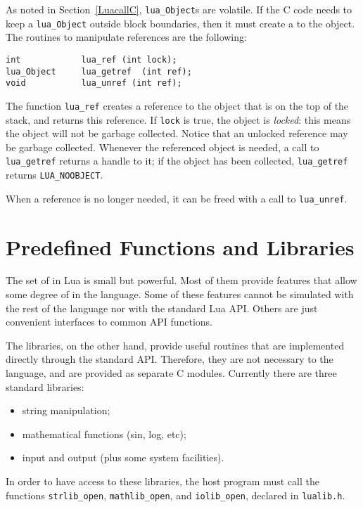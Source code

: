 As noted in Section~\ref{LuacallC}, \verb|lua_Object|s are volatile.
If the C code needs to keep a \verb|lua_Object|
outside block boundaries,
then it must create a  to the object.
The routines to manipulate references are the following:
\begin{verbatim}
int            lua_ref (int lock);
lua_Object     lua_getref  (int ref);
void           lua_unref (int ref);
\end{verbatim}
The function \verb|lua_ref| creates a reference
to the object that is on the top of the stack,
and returns this reference.
If \verb|lock| is true, the object is \emph{locked}:
this means the object will not be garbage collected.
Notice that an unlocked reference may be garbage collected.
Whenever the referenced object is needed,
a call to \verb|lua_getref|
returns a handle to it;
if the object has been collected,
\verb|lua_getref| returns \verb|LUA_NOOBJECT|.

When a reference is no longer needed,
it can be freed with a call to \verb|lua_unref|.



\section{Predefined Functions and Libraries}

The set of  in Lua is small but powerful.
Most of them provide features that allow some degree of
 in the language.
Some of these features cannot be simulated with the rest of the
language nor with the standard Lua API.
Others are just convenient interfaces to common API functions.

The libraries, on the other hand, provide useful routines
that are implemented directly through the standard API.
Therefore, they are not necessary to the language,
and are provided as separate C modules.
Currently there are three standard libraries:
\begin{itemize}
\item string manipulation;
\item mathematical functions (sin, log, etc);
\item input and output (plus some system facilities).
\end{itemize}
In order to have access to these libraries,
the host program must call the functions
\verb|strlib_open|, \verb|mathlib_open|, and \verb|iolib_open|,
declared in \verb|lualib.h|.


